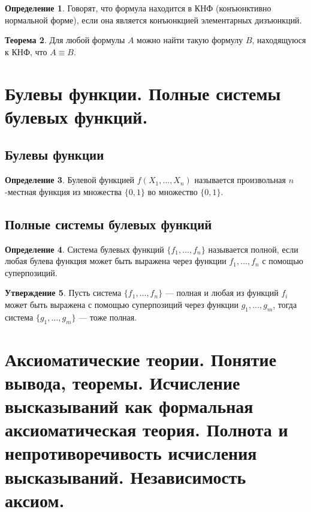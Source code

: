 \documentclass[12pt]{report}
\theoremstyle{definition}
\newtheorem{theorem}{Теорема}[chapter]
\newtheorem{definition}[theorem]{Определение}
\newtheorem{statement}[theorem]{Утверждение}
\begin{document}
\begin{definition}
Говорят, что формула находится в КНФ (конъюнктивно нормальной форме),
если она является конъюнкцией элементарных дизъюнкций.
\end{definition}

\begin{theorem}
Для любой формулы $A$ можно найти такую формулу $B$, находящуюся к КНФ,
что $A \equiv B$.
\end{theorem}

\section{Булевы функции. Полные системы булевых функций.}

\subsection{Булевы функции}

\begin{definition}
Булевой функцией $f(X_1, \dots, X_n)$ называется произвольная $n$-местная функция
из множества $\{0, 1\}$ во множество $\{0, 1\}$.
\end{definition}

\subsection{Полные системы булевых функций}
\begin{definition}
Система булевых функций $\{f_1, \dots, f_n\}$ называется полной,
если любая булева функция может быть выражена через функции $f_1, \dots, f_n$
с помощью суперпозиций.
\end{definition}

\begin{statement}
Пусть система $\{f_1, \dots, f_n\}$ --- полная и любая из функций $f_i$
может быть выражена с помощью суперпозиций через функции $g_1, \dots, g_m$,
тогда система $\{g_1, \dots, g_m\}$ --- тоже полная.
\end{statement}


\section
{
  Аксиоматические теории. Понятие вывода, теоремы.
  Исчисление высказываний как формальная аксиоматическая теория.
  Полнота и непротиворечивость исчисления высказываний.
  Независимость аксиом.
}
\end{document}
